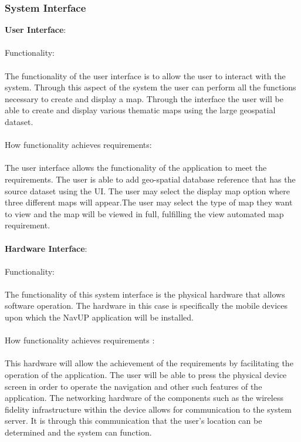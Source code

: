 \documentclass{article}
\begin{document}
        	\subsubsection{System Interface}{
\textbf{User Interface}:\\\\
Functionality:\\\\
The functionality of the user interface is to allow the user to interact with the system. Through this aspect of the system the user can perform all the functions necessary to create and display a map. Through the interface the user will be able to create and display various thematic maps using the large geospatial dataset.\\\\
How functionality achieves requirements:\\\\
The user interface allows the functionality of the application to meet the requirements. The user is able to add geo-spatial database reference that has the source dataset using the UI. The user may select the display map option where three different maps will appear.The user may select the type of map they want to view and the map will be viewed in full, fulfilling the view automated map requirement.\\\\
\textbf{Hardware Interface}:\\\\
Functionality:\\\\
The functionality of this system interface is the physical hardware that allows software operation. The hardware in this case is specifically the mobile devices upon which the NavUP application will be installed.\\\\
How functionality achieves requirements :\\\\
This hardware will allow the achievement of the requirements by facilitating the operation of the application. The user will be able to press the physical device screen in order to operate the navigation and other such features of the application. The networking hardware of the components such as the wireless fidelity infrastructure within the device allows for communication to the system server. It is through this communication that the user's location can be determined and the system can function.\\\\
}
\end{document}
